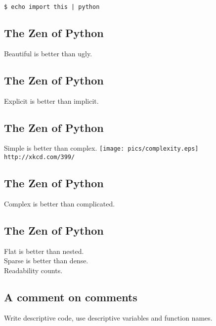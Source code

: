 \documentclass[xga]{xdvislides}
\begin{document}
\begin{verbatim}
$ echo import this | python
\end{verbatim}

\subsection{The Zen of Python}
\Huge
\begin{center}
Beautiful is better than ugly.
\end{center}

\subsection{The Zen of Python}
\begin{center}
Explicit is better than implicit.
\end{center}

\subsection{The Zen of Python}
\begin{center}
    Simple is better than complex.
\vspace*{\fill}
	\texttt{[image: pics/complexity.eps]}
	\\
	\small \verb+http://xkcd.com/399/+
\end{center}
\vspace*{\fill}
\Huge

\subsection{The Zen of Python}
\begin{center}
    Complex is better than complicated.
\end{center}

\subsection{The Zen of Python}
\begin{center}
    Flat is better than nested. \\
    Sparse is better than dense. \\
\vspace{.5in}
    Readability counts.
\end{center}

\subsection{A comment on comments}
Write descriptive code, use descriptive variables and
function names. \\
\vspace{1in}
\end{document}
